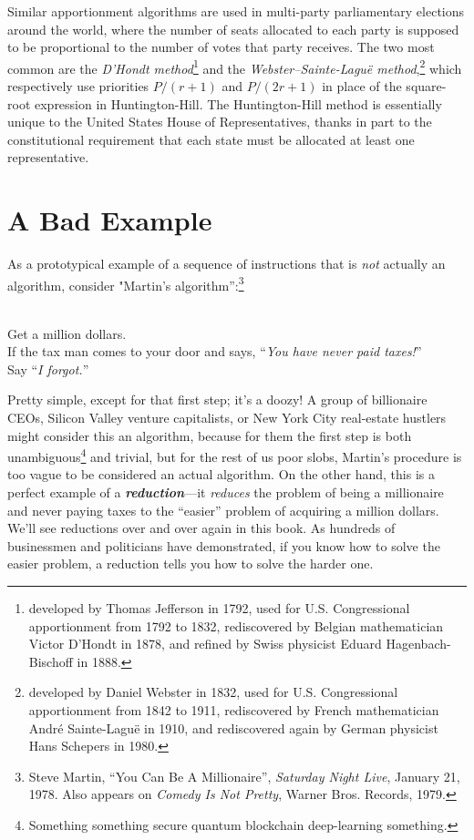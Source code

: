 Similar apportionment algorithms are used in multi-party parliamentary elections around the world, where the number of seats allocated to each party is supposed to be proportional to the number of votes that party receives. The two most common are the \textit{D’Hondt method}\footnote{developed by Thomas Jefferson in 1792, used for U.S. Congressional apportionment from 1792 to 1832, rediscovered by Belgian mathematician Victor D’Hondt in 1878, and refined by Swiss physicist Eduard Hagenbach-Bischoff in 1888.} and the \textit{Webster–Sainte-Laguë method},\footnote{developed by Daniel Webster in 1832, used for U.S. Congressional apportionment from 1842 to 1911, rediscovered by French mathematician André Sainte-Laguë in 1910, and rediscovered again by German physicist Hans Schepers in 1980.} which respectively use priorities $P/(r+1)$ and $P/(2r+1)$ in place of the square-root expression in Huntington-Hill. The Huntington-Hill method is essentially unique to the United States House of Representatives, thanks in part to the constitutional requirement that each state must be allocated at least one representative.

\section{A Bad Example}
\label{sec:0.4}

As a prototypical example of a sequence of instructions that is \textit{not} actually an algorithm, consider "Martin’s algorithm”:\footnote{Steve Martin, “You Can Be A Millionaire”, \textit{Saturday Night Live}, January 21, 1978. Also appears on \textit{Comedy Is Not Pretty}, Warner Bros. Records, 1979.}

\begin{pseudocode}
\\
Get a million dollars.\\
If the tax man comes to your door and says, “{\sffamily\itshape You have never paid taxes!}”\\
\Indent Say “{\sffamily\itshape I forgot.}”
\end{pseudocode}

Pretty simple, except for that first step; it’s a doozy! A group of billionaire CEOs, Silicon Valley venture capitalists, or New York City real-estate hustlers might consider this an algorithm, because for them the first step is both unambiguous\footnote{Something something secure quantum blockchain deep-learning something.} and trivial, but for the rest of us poor slobs, Martin’s procedure is too vague to be considered an actual algorithm. On the other hand, this is a perfect example of a \textbf{\textit{reduction}}—it \textit{reduces} the problem of being a millionaire and never paying taxes to the “easier” problem of acquiring a million dollars. We’ll see reductions over and over again in this book. As hundreds of businessmen and politicians have demonstrated, if you know how to solve the easier problem, a reduction tells you how to solve the harder one.

